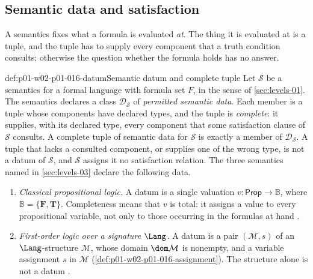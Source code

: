 \subsection{Semantic data and satisfaction}
\label{sec:p01-w02-p01-016-data}

A semantics fixes what a formula is evaluated \emph{at}. The thing it is
evaluated at is a tuple, and the tuple has to supply every component that a
truth condition consults; otherwise the question whether the formula holds
has no answer.

\begin{hbdefinition}{def:p01-w02-p01-016-datum}{Semantic datum and complete tuple}
Let \(\mathcal S\) be a semantics for a formal language with formula set
\(F\), in the sense of \cref{sec:levels-01}. The semantics declares a class
\(\mathcal D_{\mathcal S}\) of \emph{permitted semantic data}. Each member is
a tuple whose components have declared types, and the tuple is
\emph{complete}: it supplies, with its declared type, every component that
some satisfaction clause of \(\mathcal S\) consults. A complete tuple of
semantic data for \(\mathcal S\) is exactly a member of
\(\mathcal D_{\mathcal S}\). A tuple that lacks a consulted component, or
supplies one of the wrong type, is not a datum of \(\mathcal S\), and
\(\mathcal S\) assigns it no satisfaction relation. The three semantics named
in \cref{sec:levels-03} declare the following data.
\begin{enumerate}
  \item \emph{Classical propositional logic.} A datum is a single valuation
        \(v\colon\mathsf{Prop}\to\mathbb B\), where
        \(\mathbb B=\{\mathbf F,\mathbf T\}\). Completeness means that
        \(v\) is total: it assigns a value to every propositional variable,
        not only to those occurring in the formulas at hand
        \cite[ch.~``Propositional Syntax and Semantics'', definition ``Truth
        values and valuation'']{FrozenFormalLogicSemanticData}.
  \item \emph{First-order logic over a signature \(\Lang\).} A datum is a
        pair \((\mathcal M,s)\) of an \(\Lang\)-structure \(\mathcal M\),
        whose domain \(\dom\mathcal M\) is nonempty, and a variable
        assignment \(s\) in \(\mathcal M\)
        (\cref{def:p01-w02-p01-016-assignment}). The structure alone is not a
        datum
        \cite[ch.~``Structures, Satisfaction, and Translation'', definitions
        ``First-order structure'' and ``Variable assignment and
        update'']{FrozenFormalLogicSemanticData}.

\end{enumerate}
\end{hbdefinition}
